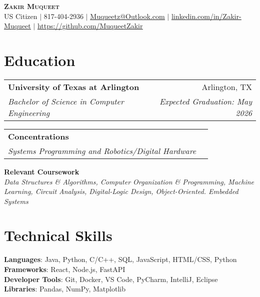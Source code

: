 \documentclass[letterpaper,11pt]{article}
\makeatletter
\newcommand{\resumeSubheading}[4]{
  \vspace{-2pt}\item
    \begin{tabular*}{0.97\textwidth}[t]{l@{\extracolsep{\fill}}r}
      \textbf{#1} & #2 \\
      \textit{\small#3} & \textit{\small #4} \\
    \end{tabular*}\vspace{-7pt}
}
\newcommand{\resumeSubHeadingListStart}{\begin{itemize}[leftmargin=0.15in, label={}]}
\newcommand{\resumeSubHeadingListEnd}{\end{itemize}}
\makeatother
\begin{document}

\begin{center}
    \textbf{\Huge \scshape Zakir Muqueet} \\ \vspace{1pt}
  \small US Citizen $|$ \small 817-404-2936 $|$ \href{mailto:x@x.com}{\underline{Muqueetz@Outlook.com}} $|$ 
    \href{https://linkedin.com/in/...}{\underline{linkedin.com/in/Zakir-Muqueet}} $|$
    \href{https://github.com/...}{\underline{https://github.com/MuqueetZakir}}
\end{center}
\section{Education}
  \resumeSubHeadingListStart
    \resumeSubheading
      {University of Texas at Arlington}{Arlington, TX}
      {Bachelor of Science in Computer Engineering}{\textit{Expected Graduation: May 2026}}
    
    \resumeSubheading
      {Concentrations}{}{Systems Programming and Robotics/Digital Hardware}{}
     \small{\item{
      \textbf{Relevant Coursework}\\ \textit{Data Structures \& Algorithms, Computer Organization \& Programming, Machine Learning, Circuit Analysis, Digital-Logic Design, Object-Oriented. Embedded Systems}}
}
  \resumeSubHeadingListEnd
\section{Technical Skills}
 \begin{itemize}[leftmargin=0.15in, label={}]
    \small{\item{
     \textbf{Languages}{: Java, Python, C/C++, SQL, JavaScript, HTML/CSS, Python} \\
     \textbf{Frameworks}{: React, Node.js, FastAPI} \\
     \textbf{Developer Tools}{: Git, Docker, VS Code, PyCharm, IntelliJ, Eclipse} \\
     \textbf{Libraries}{: Pandas, NumPy, Matplotlib}
    }}
     \end{itemize}
\end{document}
